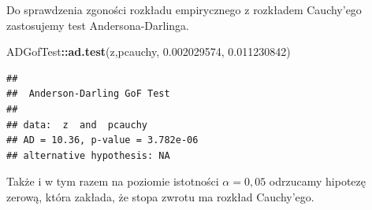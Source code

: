 \documentclass[polish,]{book}
\newenvironment{Shaded}{\begin{snugshade}}{\end{snugshade}}
\newcommand{\FloatTok}[1]{\textcolor[rgb]{0.00,0.00,0.81}{#1}}
\newcommand{\KeywordTok}[1]{\textcolor[rgb]{0.13,0.29,0.53}{\textbf{#1}}}
\newcommand{\NormalTok}[1]{#1}
\newcommand{\OperatorTok}[1]{\textcolor[rgb]{0.81,0.36,0.00}{\textbf{#1}}}
\begin{document}
Do sprawdzenia zgoności rozkładu empirycznego z rozkładem Cauchy'ego zastosujemy test Andersona-Darlinga.

\begin{Shaded}
\begin{Highlighting}[]
\NormalTok{ADGofTest}\OperatorTok{::}\KeywordTok{ad.test}\NormalTok{(z,pcauchy, }\FloatTok{0.002029574}\NormalTok{, }\FloatTok{0.011230842}\NormalTok{)}
\end{Highlighting}
\end{Shaded}

\begin{verbatim}
## 
##  Anderson-Darling GoF Test
## 
## data:  z  and  pcauchy
## AD = 10.36, p-value = 3.782e-06
## alternative hypothesis: NA
\end{verbatim}

Także i w tym razem na poziomie istotności \(\alpha = 0,05\) odrzucamy hipotezę zerową, która zakłada, że stopa zwrotu ma rozkład Cauchy'ego.
\end{document}
